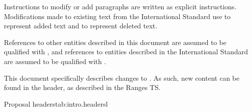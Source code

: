 \pnum
Instructions to modify or add paragraphs are written as explicit instructions.
Modifications made to existing text from the International Standard use
 to represent added text and  to
represent deleted text.

\pnum
References to other entities described in this document are assumed to be
qualified with , and references to entities
described in the International Standard are assumed to be qualified with .

\pnum
This document specifically describes changes to . As such, new content can be found
in the  header, as described in the Ranges TS.

\begin{floattable}{Proposal headers}{tab:intro.headers}{l}
\topline
{}\\
\bottomline
\end{floattable}
